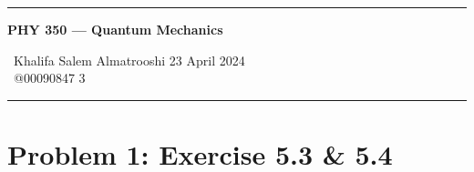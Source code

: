 \documentclass{article}
\begin{document}
	
	\begin{center}
		\hrule
		\vspace{0.4cm}
		\textbf { \Large PHY 350 --- Quantum Mechanics}
		\vspace{0.4cm}
	\end{center}
		 \ Khalifa Salem Almatrooshi \hspace{\fill}  23 April 2024 \\
		 \ @00090847 \hspace{\fill}  3 \\
		\hrule	
	
	\section*{Problem 1: Exercise 5.3 \& 5.4}
	
\end{document}
